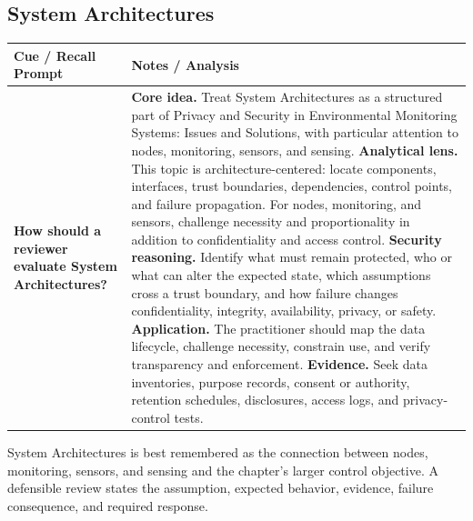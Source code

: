\documentclass[11pt]{article}
\newcommand{\CornellHeader}{%
\rowcolor{Navy}\color{white}\bfseries Cue / Recall Prompt & \color{white}\bfseries Notes / Analysis\\\hline}
\newcommand{\CornellRow}[2]{%
\cellcolor{CueGray}\RaggedRight\textbf{#1} & \RaggedRight #2\\\hline}
\begin{document}
\subsection*{System Architectures}
\begin{longtable}{>{\RaggedRight\arraybackslash}p{}|>{\RaggedRight\arraybackslash}p{}}
\CornellHeader
\CornellRow{How should a reviewer evaluate System Architectures?}{\textbf{Core idea.} Treat System Architectures as a structured part of Privacy and Security in Environmental Monitoring Systems: Issues and Solutions, with particular attention to nodes, monitoring, sensors, and sensing. \textbf{Analytical lens.} This topic is architecture-centered: locate components, interfaces, trust boundaries, dependencies, control points, and failure propagation. For nodes, monitoring, and sensors, challenge necessity and proportionality in addition to confidentiality and access control. \textbf{Security reasoning.} Identify what must remain protected, who or what can alter the expected state, which assumptions cross a trust boundary, and how failure changes confidentiality, integrity, availability, privacy, or safety. \textbf{Application.} The practitioner should map the data lifecycle, challenge necessity, constrain use, and verify transparency and enforcement. \textbf{Evidence.} Seek data inventories, purpose records, consent or authority, retention schedules, disclosures, access logs, and privacy-control tests.}
\end{longtable}
\begin{topicsummary}
System Architectures is best remembered as the connection between nodes, monitoring, sensors, and sensing and the chapter's larger control objective. A defensible review states the assumption, expected behavior, evidence, failure consequence, and required response.
\end{topicsummary}
\end{document}

